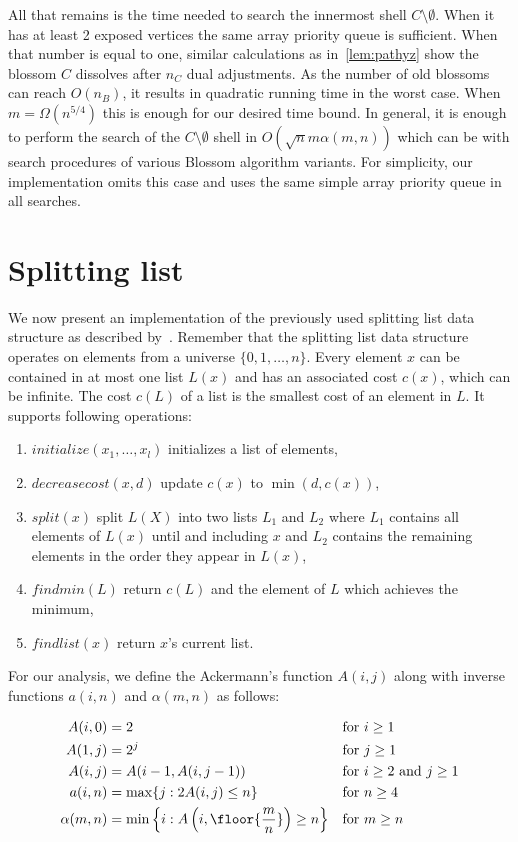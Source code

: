 All that remains is the time needed to search the innermost shell $C \setminus \emptyset$. When it has at least 2 exposed vertices the same array priority queue is sufficient. When that number is equal to one, similar calculations as in~\ref{lem:pathyz} show the blossom $C$ dissolves after $n_C$ dual adjustments. As the number of old blossoms can reach $O(n_B)$, it results in quadratic running time in the worst case. When $m = \Omega(n^{5/4})$ this is enough for our desired time bound. In general, it is enough to perform the search of the $C \setminus \emptyset$ shell in $O(\sqrt{n}m \alpha(m,n))$ which can be with search procedures of various Blossom algorithm variants. For simplicity, our implementation omits this case and uses the same simple array priority queue in all searches.

\section{Splitting list}

We now present an implementation of the previously used splitting list data structure as described by~\cite{gabow1985scaling}. Remember that the splitting list data structure operates on elements from a universe $\{0, 1, \dots, n\}$. Every element $x$ can be contained in at most one list $L(x)$ and has an associated cost $c(x)$, which can be infinite. The cost $c(L)$ of a list is the smallest cost of an element in $L$. It supports following operations:

\begin{enumerate}
    \item $initialize(x_1, \dots, x_l)$ initializes a list of elements,
    \item $decreasecost(x, d)$ update $c(x)$ to $\min(d, c(x))$,
    \item $split(x)$ split $L(X)$ into two lists $L_1$ and $L_2$ where $L_1$ contains all elements of $L(x)$ until and including $x$ and $L_2$ contains the remaining elements in the order they appear in $L(x)$,
    \item $findmin(L)$ return $c(L)$ and the element of $L$ which achieves the minimum,
    \item $findlist(x)$ return $x$'s current list.
\end{enumerate}

For our analysis, we define the Ackermann's function $A(i,j)$ along with inverse functions $a(i,n)$ and $\alpha(m, n)$ as follows:

\begin{align*}
    A(i,0) &= 2 &&\text{for $i \geq 1$} \\
    A(1,j) &= 2^j &&\text{for $j \geq 1$} \\
    A(i,j) &= A(i-1,A(i, j-1)) &&\text{for $i \geq 2$ and $j \geq 1$} \\
    a(i,n) &= \max \{ j: 2A(i,j) \leq n \} &&\text{for $n \geq 4$} \\
    \alpha(m,n) &= \min \left\{ i: A\left(i,\floor{\frac{m}{n}}\right) \geq n \right\} &&\text{for $m \geq n$}
\end{align*}

